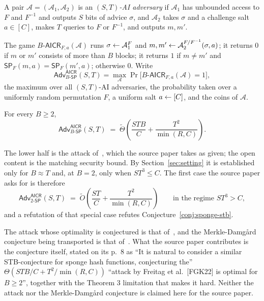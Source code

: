 \documentclass{aicr-conjecture}
\newcommand{\SP}{\mathsf{SP}}
\newcommand{\Adv}{\mathsf{Adv}}
\newcommand{\AICR}{\mathsf{AICR}}
\newcommand{\tO}{\tilde{O}}
\newcommand{\tTh}{\tilde{\Theta}}
\begin{document}
\begin{definition}\label{def:aicr}
A pair $\mathcal{A} = (\mathcal{A}_{1}, \mathcal{A}_{2})$ is an
\emph{$(S,T)$-AI adversary} if $\mathcal{A}_{1}$ has unbounded access
to $F$ and $F^{-1}$ and outputs $S$ bits of advice $\sigma$, and
$\mathcal{A}_{2}$ takes $\sigma$ and a challenge salt $a \in [C]$,
makes $T$ queries to $F$ or $F^{-1}$, and outputs $m, m'$.

The game $B\text{-}\AICR_{F,a}(\mathcal{A})$ runs
$\sigma \leftarrow \mathcal{A}_{1}^{F}$ and
$m, m' \leftarrow \mathcal{A}_{2}^{F/F^{-1}}(\sigma, a)$; it returns $0$
if $m$ or $m'$ consists of more than $B$ blocks; it returns $1$ if
$m \ne m'$ and $\SP_{F}(m,a) = \SP_{F}(m',a)$; otherwise $0$. Write
\[
  \Adv^{\AICR}_{B\text{-}\SP}(S,T)
  = \max_{\mathcal{A}}
    \Pr\bigl[B\text{-}\AICR_{F,a}(\mathcal{A}) = 1\bigr],
\]
the maximum over all $(S,T)$-AI adversaries, the probability taken over
a uniformly random permutation $F$, a uniform salt $a \leftarrow [C]$, and
the coins of $\mathcal{A}$.
\end{definition}

\begin{conjecture}\label{conj:sponge-stb}
For every $B \ge 2$,
\[
  \Adv^{\AICR}_{B\text{-}\SP}(S,T)
  \;=\; \tTh\!\left(\frac{STB}{C}
        + \frac{T^{2}}{\min(R,C)}\right).
\]
\end{conjecture}

The lower half is the attack of~\cite{FGK22}, which the source paper
takes as given; the open content is the matching security bound. By
Section~\ref{sec:setting} it is established only for $B \approx T$ and,
at $B = 2$, only when $ST^{3} \le C$. The first case the source paper
asks for is therefore
\[
  \Adv^{\AICR}_{2\text{-}\SP}(S,T)
  \;=\; \tO\!\left(\frac{ST}{C}
        + \frac{T^{2}}{\min(R,C)}\right)
  \qquad \text{in the regime } ST^{3} > C,
\]
and a refutation of that special case refutes
Conjecture~\ref{conj:sponge-stb}.

\begin{remark}\label{rem:attribution}
The attack whose optimality is conjectured is that
of~\cite{FGK22}, and the Merkle-Damg\aa{}rd conjecture being
transported is that of~\cite{ACDW20}. What the source paper contributes
is the conjecture itself, stated on its p.~8 as ``It is natural to
consider a similar STB-conjecture for sponge hash functions,
conjecturing the'' $\Theta(STB/C + T^{2}/\min(R,C))$ ``attack by
Freitag et al.\ [FGK22] is optimal for $B \ge 2$'', together with the
Theorem 3 limitation that makes it hard. Neither the attack nor the
Merkle-Damg\aa{}rd conjecture is claimed here for the source paper.
\end{remark}
\end{document}
